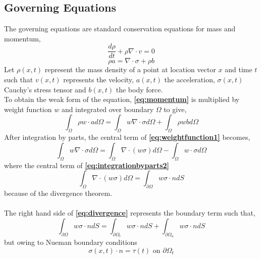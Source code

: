 \subsection{Governing Equations}
The governing equations are standard conservation equations for mass and momentum,
\begin{equation}
\frac{d\rho}{dt} + \rho\nabla\cdot v = 0
\label{eq:mass}
\end{equation}
\begin{equation}
\rho a = \nabla\cdot\sigma + \rho b
\label{eq:momentum}
\end{equation}
Let $\rho(x,t)$ represent the mass density of a point at location vector $x$ and time $t$ such that $v(x,t)$ represents the velocity, $a(x,t)$ the acceleration, $\sigma(x,t)$ Cauchy's stress tensor and $b(x,t)$ the body force.\\
\newline
\noindent
To obtain the weak form of the equation, {\bfseries \ref{eq:momentum}} is multiplied by weight function $w$ and integrated over boundary $\Omega$ to give,
\begin{equation}
\int_\Omega \rho w \cdot ad\Omega = \int_\Omega w\nabla\cdot\sigma d\Omega + \int_\Omega \rho w b d\Omega
\label{eq:weightfunction1}
\end{equation}
After integration by parts, the central term of {\bfseries \ref{eq:weightfunction1}} becomes,
\begin{equation}
\int_\Omega w\nabla\cdot\sigma d\Omega= \int_\Omega\nabla\cdot (w\sigma) d\Omega- \int_\Omega w\cdot\sigma d\Omega
\label{eq:integrationbyparts2}
\end{equation}
where the central term of {\bfseries \ref{eq:integrationbyparts2}}
\begin{equation}
\int_\Omega\nabla\cdot (w\sigma) d\Omega= \int_{\partial\Omega} w \sigma \cdot n dS
\label{eq:divergence}
\end{equation}
because of the divergence theorem. \\\\The right hand side of {\bfseries \ref{eq:divergence}} represents the boundary term such that,
\begin{equation}
\int_{\partial\Omega} w \sigma \cdot n dS = \int_{\partial\Omega_t} w\sigma\cdot n dS + \int_{\partial\Omega_u} w\sigma\cdot n dS
\label{eq:boundary1}
\end{equation}
but owing to Nueman boundary conditions
\begin{equation}
\sigma(x,t)\cdot n = \tau(t) \text{ on } \partial\Omega_t
\label{eq:neumen}
\end{equation}
